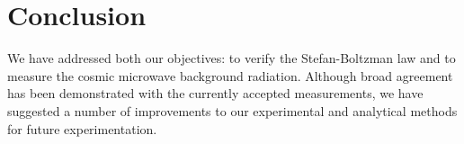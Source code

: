 \documentclass{article}%
\begin{document}
%

%
\section{Conclusion}%
\label{sec:Conclusion}%
We have addressed both our objectives: to verify the Stefan-Boltzman law and to measure the cosmic microwave background radiation.
Although broad agreement has been demonstrated with the currently accepted measurements, we have suggested a number of improvements to our experimental and analytical methods for future experimentation. \par
%
\printbibliography 

%
\end{document}
